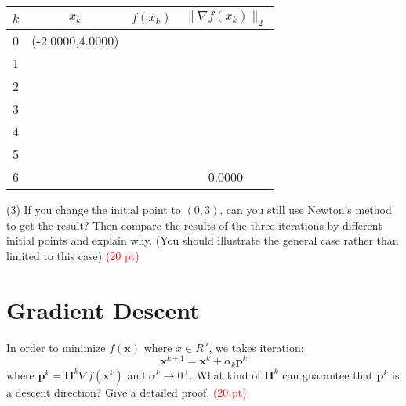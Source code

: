 \documentclass[8pt]{article}
\begin{document}
\begin{table}[h]
    \centering  
\begin{tabular}{l|c|c|c}
\hline
$k$ & $x_{k}$           & $f(x_k)$  & $\|\nabla f(x_k)\|_2$ \\ \hline
0 & (-2.0000,4.0000)  &        &             \\
1 &                   &        &             \\
2 &                   &        &             \\
3 &                   &        &              \\
4 &                   &        &             \\
5 &                   &        &             \\
6 &                   &        &    0.0000    \\ \hline
\end{tabular}
\end{table}
(3) If you change the initial point to $(0,3)$, can you still use Newton's method to get the result? Then compare the results of the three iterations by different initial points and explain why. (You should illustrate the general case rather than limited to this case) \textcolor{red}{(20 pt)}

\section{Gradient Descent}
In order to minimize 
$f(\boldsymbol{x})$ 
where $x \in R^n$, 
we takes iteration:
$$\boldsymbol{x}^{k+1}=\boldsymbol{x}^{k}+\alpha_{k} \boldsymbol{p}^{k}$$
where $\boldsymbol{p}^{k}=\boldsymbol{H}^{k} \nabla f\left(\boldsymbol{x}^{k}\right)$ and $\alpha^k \to 0^+$. What kind of $\boldsymbol{H}^{k}$ can guarantee that $\boldsymbol{p}^{k}$ is a descent direction? Give a detailed proof. \textcolor{red}{(20 pt)}\\
\end{document}
